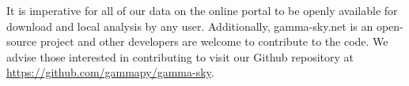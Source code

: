     It is imperative for all of our data on the online portal to be openly available for download and local analysis by any user. Additionally, gamma-sky.net is an open-source project and other developers are welcome to contribute to the code. We advise those interested in contributing to visit our Github repository at \url{https://github.com/gammapy/gamma-sky}.
